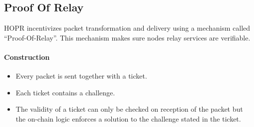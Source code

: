 \subsection{Proof Of Relay}

HOPR incentivizes packet transformation and delivery using a mechanism called “Proof-Of-Relay”.
This mechanism makes sure nodes relay services are verifiable.
\paragraph{Construction}
\begin{itemize}
    \item Every packet is sent together with a ticket.
    \item Each ticket contains a challenge.
    \item The validity of a ticket can only be checked on reception of the packet but the on-chain logic enforces a solution to the challenge stated in the ticket.
\end{itemize}

